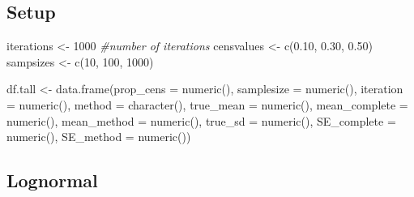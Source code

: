 \documentclass[12pt, twoside]{amherstthesis}
\newenvironment{Shaded}{\begin{snugshade}}{\end{snugshade}}
\newcommand{\AttributeTok}[1]{\textcolor[rgb]{0.77,0.63,0.00}{#1}}
\newcommand{\CommentTok}[1]{\textcolor[rgb]{0.56,0.35,0.01}{\textit{#1}}}
\newcommand{\ConstantTok}[1]{\textcolor[rgb]{0.00,0.00,0.00}{#1}}
\newcommand{\DecValTok}[1]{\textcolor[rgb]{0.00,0.00,0.81}{#1}}
\newcommand{\FloatTok}[1]{\textcolor[rgb]{0.00,0.00,0.81}{#1}}
\newcommand{\FunctionTok}[1]{\textcolor[rgb]{0.00,0.00,0.00}{#1}}
\newcommand{\NormalTok}[1]{#1}
\newcommand{\OtherTok}[1]{\textcolor[rgb]{0.56,0.35,0.01}{#1}}
\newcommand{\SpecialCharTok}[1]{\textcolor[rgb]{0.00,0.00,0.00}{#1}}
\newcommand{\StringTok}[1]{\textcolor[rgb]{0.31,0.60,0.02}{#1}}
\begin{document}
\begin{Shaded}
\end{Shaded}
\hypertarget{setup}{%
\subsection{Setup}\label{setup}}
\begin{Shaded}
\begin{Highlighting}[]
\NormalTok{iterations }\OtherTok{\textless{}{-}} \DecValTok{1000} \CommentTok{\#number of iterations}
\NormalTok{censvalues }\OtherTok{\textless{}{-}} \FunctionTok{c}\NormalTok{(}\FloatTok{0.10}\NormalTok{, }\FloatTok{0.30}\NormalTok{, }\FloatTok{0.50}\NormalTok{)}
\NormalTok{sampsizes }\OtherTok{\textless{}{-}} \FunctionTok{c}\NormalTok{(}\DecValTok{10}\NormalTok{, }\DecValTok{100}\NormalTok{, }\DecValTok{1000}\NormalTok{)}

\NormalTok{df.tall }\OtherTok{\textless{}{-}} \FunctionTok{data.frame}\NormalTok{(}\AttributeTok{prop\_cens =} \FunctionTok{numeric}\NormalTok{(),}
                      \AttributeTok{samplesize =} \FunctionTok{numeric}\NormalTok{(),}
                      \AttributeTok{iteration =} \FunctionTok{numeric}\NormalTok{(),}
                      \AttributeTok{method =} \FunctionTok{character}\NormalTok{(),}
                      \AttributeTok{true\_mean =} \FunctionTok{numeric}\NormalTok{(),}
                      \AttributeTok{mean\_complete =} \FunctionTok{numeric}\NormalTok{(),}
                      \AttributeTok{mean\_method =} \FunctionTok{numeric}\NormalTok{(),}
                      \AttributeTok{true\_sd =} \FunctionTok{numeric}\NormalTok{(),}
                      \AttributeTok{SE\_complete =} \FunctionTok{numeric}\NormalTok{(),}
                      \AttributeTok{SE\_method =} \FunctionTok{numeric}\NormalTok{())}
\end{Highlighting}
\end{Shaded}
\hypertarget{lognormal}{%
\subsection{Lognormal}\label{lognormal}}
\end{document}
